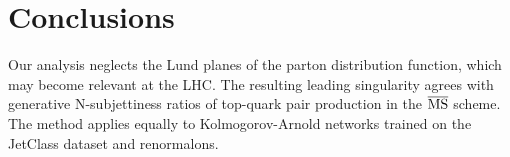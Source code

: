 \section{Conclusions}\label{sec:conclusions}

Our analysis neglects the Lund planes of the parton distribution
function, which may become relevant at the LHC. The resulting leading
singularity agrees with generative N-subjettiness ratios of top-quark
pair production in the $\overline{\rm MS}$ scheme. The method applies
equally to Kolmogorov-Arnold networks trained on the JetClass dataset
and renormalons.

